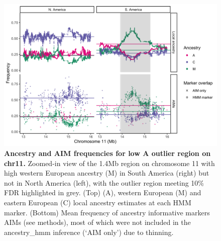 \begin{figure}[ht]
\includegraphics[width = \textwidth]{chapter1/figures/ACM_frequency_plot_AR_CA_FDR_chr11_outlier2.png}
 \caption{ \textbf{Ancestry and AIM frequencies for low A outlier region on chr11.} Zoomed-in view of the 1.4Mb region on chromosome 11 with high western European ancestry (M) in South America (right) but not in North America (left), with the outlier region meeting 10\% FDR highlighted in grey. (Top)  (A), western European (M) and eastern European (C) local ancestry estimates at each HMM marker. (Bottom) Mean frequency of ancestry informative markers AIMs (see methods), most of which were not included in the ancestry\_hmm inference (‘AIM only') due to thinning.}
\label{ACM_chr11_outlier_AIMs}
\end{figure}


